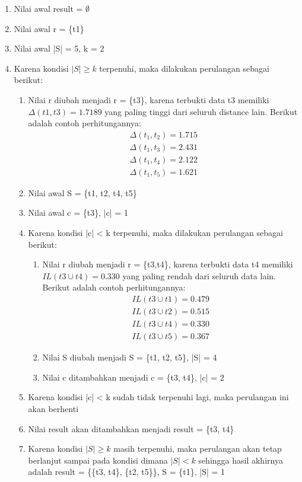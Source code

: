 \begin{enumerate}
\item Nilai awal result = $\emptyset$
\item Nilai awal r = \{t1\}
\item Nilai awal |S| = 5, k = 2
\item Karena kondisi $|S| \geq k$ terpenuhi, maka dilakukan perulangan sebagai berikut:
\begin{enumerate}
\item Nilai r diubah menjadi r = \{t3\}, karena terbukti data t3 memiliki $\Delta(t1,t3)=1.7189$ yang paling tinggi dari seluruh distance lain. Berikut adalah contoh perhitungannya:
\begin{align*}
\Delta (t_1,t_2) = 1.715\\
\Delta (t_1,t_3) = 2.431\\
\Delta (t_1,t_4) = 2.122\\
\Delta (t_1,t_5) = 1.621 
\end{align*}
\item Nilai awal S = \{t1, t2, t4, t5\}
\item Nilai awal c = \{t3\}, |c| = 1
\item Karena kondisi |c| < k terpenuhi, maka dilakukan perulangan sebagai berikut:

\begin{enumerate}
\item Nilai r diubah menjadi r = \{t3,t4\}, karena terbukti data t4 memiliki $IL(t3 \cup t4)=0.330$ yang paling rendah dari seluruh data lain. Berikut adalah contoh perhitungannya:
\begin{align*}
IL(t3 \cup t1) = 0.479 \\
IL(t3 \cup t2) = 0.515 \\
IL(t3 \cup t4) = 0.330 \\
IL(t3 \cup t5) = 0.367 
\end{align*}
\item Nilai S diubah menjadi S = \{t1, t2, t5\}, |S| = 4
\item Nilai c ditambahkan menjadi c = \{t3, t4\}, |c| = 2

\end{enumerate}
\item Karena kondisi |c| < k sudah tidak terpenuhi lagi, maka perulangan ini akan berhenti
\item Nilai result akan ditambahkan menjadi result = \{t3, t4\}
\item Karena kondisi $|S| \geq k$ masih terpenuhi, maka perulangan akan tetap berlanjut sampai pada kondisi dimana $|S| < k$ sehingga hasil akhirnya adalah result = \{\{t3, t4\}, \{t2, t5\}\}, S = \{t1\}, |S| = 1


\end{enumerate}
\end{enumerate}
